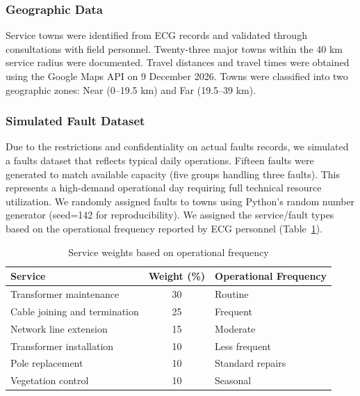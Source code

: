 \documentclass[11pt]{article}
\begin{document}
\subsubsection*{Geographic Data}

Service towns were identified from ECG records and validated through consultations
with field personnel. Twenty-three major towns within the 40 km service radius were
documented. Travel distances and travel times were obtained using the Google Maps
API on 9 December 2026. Towns were classified into two geographic zones: Near
(0–19.5 km) and Far (19.5–39 km).

\subsubsection*{Simulated Fault Dataset}

Due to the restrictions and confidentiality on actual faults records, we simulated a faults dataset that reflects typical daily operations. Fifteen faults were generated to match available capacity (five groups handling three faults). This represents a high-demand operational day requiring full technical resource utilization. We randomly assigned faults to towns using Python's random number generator (seed=142 for reproducibility). We assigned the service/fault types based on the operational frequency reported by ECG personnel (Table~\ref{tab:weights}).



\begin{table}[H]
\centering
\caption{Service weights based on operational frequency}
\label{tab:weights}
\begin{tabular}{l c l}
\toprule
Service & Weight (\%) & Operational Frequency \\
\midrule
Transformer maintenance & 30 & Routine \\
Cable joining and termination & 25 & Frequent \\
Network line extension & 15 & Moderate \\
Transformer installation & 10 & Less frequent \\
Pole replacement & 10 & Standard repairs \\
Vegetation control & 10 & Seasonal \\
\bottomrule
\end{tabular}
\end{table}
\end{document}
